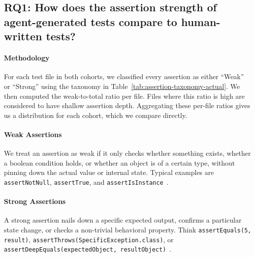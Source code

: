 \documentclass[conference]{IEEEtran}
\begin{document}
\subsection{RQ1: How does the assertion strength of agent-generated tests compare to human-written tests?}
\label{ssec:rq1}
 
\paragraph{\textbf{Methodology}}
For each test file in both cohorts, we classified every assertion as either ``Weak'' or ``Strong'' using the taxonomy in Table~\ref{tab:assertion-taxonomy-actual}. We then computed the weak-to-total ratio per file. Files where this ratio is high are considered to have shallow assertion depth. Aggregating these per-file ratios gives us a distribution for each cohort, which we compare directly.

\paragraph{\textbf{Weak Assertions}}
We treat an assertion as weak if it only checks whether something exists, whether a boolean condition holds, or whether an object is of a certain type, without pinning down the actual value or internal state. Typical examples are \texttt{assertNotNull}, \texttt{assertTrue}, and \texttt{assertIsInstance}~\cite{schafer2023empirical}.

\paragraph{\textbf{Strong Assertions}}
A strong assertion nails down a specific expected output, confirms a particular state change, or checks a non-trivial behavioral property. Think \texttt{assertEquals(5, result)}, \texttt{assertThrows(SpecificException.class)}, or \texttt{assertDeepEquals(expectedObject, resultObject)}~\cite{schafer2023empirical}.
\end{document}
